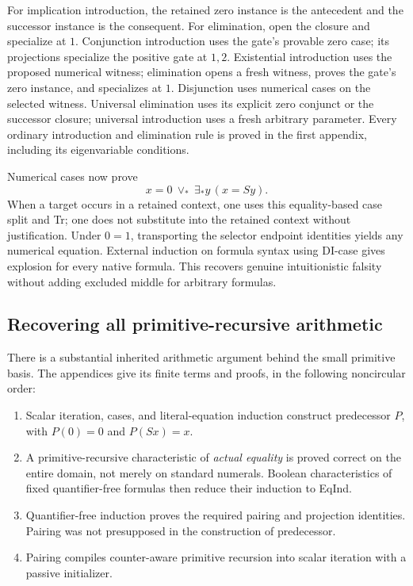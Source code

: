 For implication introduction, the retained zero instance is the
antecedent and the successor instance is the consequent. For elimination,
open the closure and specialize at $1$. Conjunction introduction uses
the gate's provable zero case; its projections specialize the positive
gate at $1,2$. Existential introduction uses the proposed numerical
witness; elimination opens a fresh witness, proves the gate's zero
instance, and specializes at $1$. Disjunction uses numerical cases on
the selected witness. Universal elimination uses its explicit zero
conjunct or the successor closure; universal introduction uses a fresh
arbitrary parameter. Every ordinary introduction and elimination rule
is proved in the first appendix, including its eigenvariable conditions.

Numerical cases now prove
\[
 x=0\ \vee_*\ \exists_*y\,(x=Sy).
\]
When a target occurs in a retained context, one uses this equality-based
case split and Tr; one does not substitute into the retained context
without justification. Under $0=1$, transporting the selector endpoint
identities yields any numerical equation. External induction on formula
syntax using DI-case gives explosion for every native formula. This
recovers genuine intuitionistic falsity without adding excluded middle
for arbitrary formulas.

\subsection{Recovering all primitive-recursive arithmetic}

There is a substantial inherited arithmetic argument behind the small
primitive basis. The appendices give its finite terms and proofs, in
the following noncircular order:
\begin{enumerate}
\item Scalar iteration, cases, and literal-equation induction construct
      predecessor $P$, with $P(0)=0$ and $P(Sx)=x$.
\item A primitive-recursive characteristic of \emph{actual equality}
      is proved correct on the entire domain, not merely on standard
      numerals. Boolean characteristics of fixed quantifier-free
      formulas then reduce their induction to EqInd.
\item Quantifier-free induction proves the required pairing and
      projection identities. Pairing was not presupposed in the
      construction of predecessor.
\item Pairing compiles counter-aware primitive recursion into
      scalar iteration with a passive initializer.
\end{enumerate}

